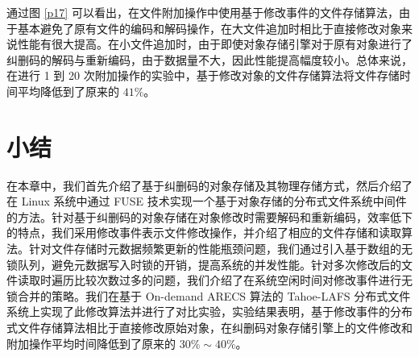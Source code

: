 通过图 \ref{p17} 可以看出，在文件附加操作中使用基于修改事件的文件存储算法，由于基本避免了原有文件的编码和解码操作，在大文件追加时相比于直接修改对象来说性能有很大提高。在小文件追加时，由于即使对象存储引擎对于原有对象进行了纠删码的解码与重新编码，由于数据量不大，因此性能提高幅度较小。总体来说，在进行 1 到 20 次附加操作的实验中，基于修改对象的文件存储算法将文件存储时间平均降低到了原来的 $41\%$。
\section{小结}
在本章中，我们首先介绍了基于纠删码的对象存储及其物理存储方式，然后介绍了在 Linux 系统中通过 FUSE 技术实现一个基于对象存储的分布式文件系统中间件的方法。针对基于纠删码的对象存储在对象修改时需要解码和重新编码，效率低下的特点，我们采用修改事件表示文件修改操作，并介绍了相应的文件存储和读取算法。针对文件存储时元数据频繁更新的性能瓶颈问题，我们通过引入基于数组的无锁队列，避免元数据写入时锁的开销，提高系统的并发性能。针对多次修改后的文件读取时遍历比较次数过多的问题，我们介绍了在系统空闲时间对修改事件进行无锁合并的策略。我们在基于 On-demand ARECS 算法的 Tahoe-LAFS 分布式文件系统上实现了此修改算法并进行了对比实验，实验结果表明，基于修改事件的分布式文件存储算法相比于直接修改原始对象，在纠删码对象存储引擎上的文件修改和附加操作平均时间降低到了原来的 $30\%\sim40\%$。
